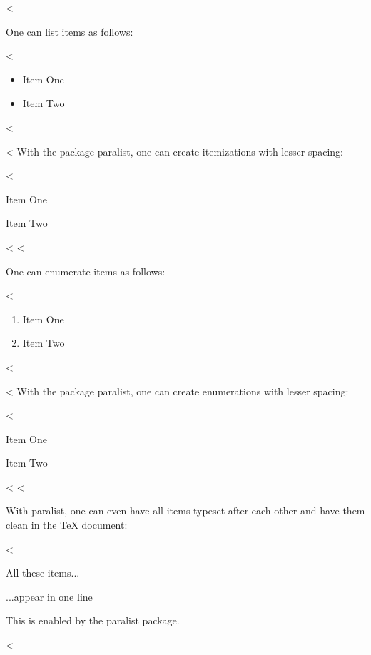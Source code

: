 <%

One can list items as follows:

<%
\begin{itemize}
  \item Item One
  \item Item Two
\end{itemize}
<%

<%
With the package paralist, one can create itemizations with lesser spacing:

<%
\begin{compactitem}
  \item Item One
  \item Item Two
\end{compactitem}
<%
<%

One can enumerate items as follows:

<%
\begin{enumerate}
  \item Item One
  \item Item Two
\end{enumerate}
<%

<%
With the package paralist, one can create enumerations with lesser spacing:

<%
\begin{compactenum}
  \item Item One
  \item Item Two
\end{compactenum}
<%
<%

With paralist, one can even have all items typeset after each other and have them clean in the TeX document:

<%
\begin{inparaenum}
  \item All these items...
  \item ...appear in one line
  \item This is enabled by the paralist package.
\end{inparaenum}
<%
